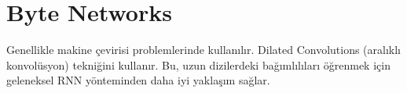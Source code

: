 \section{Byte Networks}
Genellikle makine çevirisi problemlerinde kullanılır. Dilated Convolutions (aralıklı konvolüsyon) tekniğini kullanır. Bu, uzun dizilerdeki bağımlılıları öğrenmek için geleneksel RNN yönteminden daha iyi yaklaşım sağlar. 

\newpage